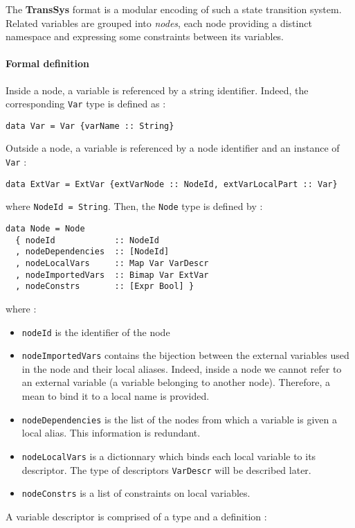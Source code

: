 The \textbf{TransSys} format is a modular encoding of such a state transition system. Related variables are grouped into \textit{nodes}, each node providing a distinct namespace and expressing some constraints between its variables. 



\paragraph{Formal definition}

Inside a node, a variable is referenced by a string identifier. Indeed, the corresponding \texttt{Var} type is defined as :
\begin{lstlisting}[frame=single]
data Var = Var {varName :: String}
\end{lstlisting}
Outside a node, a variable is referenced by a node identifier and an instance of \texttt{Var} :
\begin{lstlisting}[frame=single]
data ExtVar = ExtVar {extVarNode :: NodeId, extVarLocalPart :: Var} 
\end{lstlisting}
where \texttt{NodeId = String}. Then, the \texttt{Node} type is defined by :
\begin{lstlisting}[frame=single]
data Node = Node
  { nodeId            :: NodeId
  , nodeDependencies  :: [NodeId]
  , nodeLocalVars     :: Map Var VarDescr
  , nodeImportedVars  :: Bimap Var ExtVar 
  , nodeConstrs       :: [Expr Bool] }
\end{lstlisting} 
where :
\begin{itemize}
\item \texttt{nodeId} is the identifier of the node
\item \texttt{nodeImportedVars} contains the bijection between the external variables used in the node and their local aliases. Indeed, inside a node we cannot refer to an external variable (a variable belonging to another node). Therefore, a mean to bind it to a local name is provided.
\item \texttt{nodeDependencies} is the list of the nodes from which a variable is given a local alias. This information is redundant.
\item \texttt{nodeLocalVars} is a dictionnary which binds each local variable to its descriptor. The type of descriptors \texttt{VarDescr} will be described later.
\item \texttt{nodeConstrs} is a list of constraints on local variables.
\end{itemize}
A variable descriptor is comprised  of a type and a definition :

